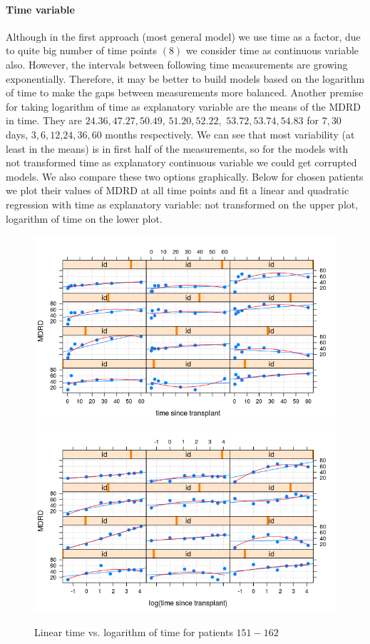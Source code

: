 \documentclass[num-refs]{wiley-article}
\begin{document}
\paragraph{Time variable}

Although in the first approach (most general model) we use time as a factor, due to quite big number of time points $(8)$ we consider time as continuous variable also. However, the intervals between following time measurements are growing exponentially. Therefore, it may be better to build models based on the logarithm of time to make the gaps between measurements more balanced. Another premise for taking logarithm of time as explanatory variable are the means of the MDRD in time. They are $24.36, 47.27, 50.49$, $51.20, 52.22,$ $53.72, 53.74, 54.83$ for $7, 30$ days, $3,6,12$,$24,36,60$ months respectively. We can see that most variability (at least in the means) is in first half of the measurements, so for the models with not transformed time as explanatory continuous variable we could get corrupted models. We also compare these two options graphically. Below for chosen patients we plot their values of MDRD at all time points and fit a linear and quadratic regression with time as explanatory variable: not transformed on the upper plot, logarithm of time on the lower plot.
\begin{figure}[H] 
\centering
\includegraphics[height=0.4\textheight, width=\textwidth]{pictures/time.png}
\includegraphics[height=0.4\textheight, width=\textwidth]{pictures/ltime.png}
\caption{Linear time vs. logarithm of time for patients $151-162$} \label{timePlot}
\end{figure}
\end{document}
